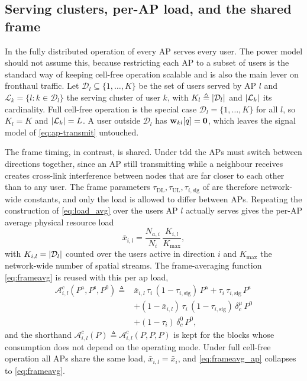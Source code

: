 \subsection{Serving clusters, per-AP load, and the shared frame}
\label{ssec:dmimo_frame}

In the fully distributed operation of  every AP serves
every user. The power model should not assume this, because restricting each AP
to a subset of users is the standard way of keeping cell-free operation scalable
and is also the main lever on fronthaul traffic. Let
$\mathcal{D}_{l}\subseteq\{1,\dots,K\}$ be the set of users served by AP $l$ and
$\mathcal{L}_{k}=\{l:k\in\mathcal{D}_{l}\}$ the serving cluster of user $k$, with
$K_{l}\triangleq\left\lvert\mathcal{D}_{l}\right\rvert$ and $\left\lvert\mathcal{L}_{k}\right\rvert$ its
cardinality. Full cell-free operation is the special case
$\mathcal{D}_{l}=\{1,\dots,K\}$ for all $l$, so $K_{l}=K$ and
$\left\lvert\mathcal{L}_{k}\right\rvert=L$. A user outside $\mathcal{D}_{l}$ has
$\boldsymbol{\mathrm{w}}_{kl}[q]=\boldsymbol{\mathrm{0}}$, which leaves the signal model of
\eqref{eq:ap-transmit} untouched.

The frame timing, in contrast, is shared. Under \gls{tdd} the APs must switch
between directions together, since an AP still transmitting while a neighbour
receives creates cross-link interference between nodes that are far closer to
each other than to any user. The frame parameters
$\tau_{\mathrm{DL}},\tau_{\mathrm{UL}},\tau_{i,\mathrm{sig}}$ of
 are therefore network-wide constants, and only the load is
allowed to differ between APs. Repeating the construction of
\eqref{eq:load_avg} over the users AP $l$ actually serves gives the per-AP
average physical resource load
\begin{equation}
\label{eq:load_ap}
\bar x_{i,l} = \frac{N_{a,i}}{N_{i}}\,\frac{K_{i,l}}{K_{\max}},
\end{equation}
with $K_{i,l}=\left\lvert\mathcal{D}_{l}\right\rvert$ counted over the users active in direction
$i$ and $K_{\max}$ the network-wide number of spatial streams. The
frame-averaging function \eqref{eq:frameavg} is reused with this per \gls{ap} load,
\begin{align}
\label{eq:frameavg_ap}
\mathcal{A}_{i,l}^{c}\!\left(P^{\mathrm a},P^{\mathrm s},P^{0}\right)
\triangleq{}&
\bar x_{i,l}\,\tau_i\,(1-\tau_{i,\mathrm{sig}})\,P^{\mathrm a}
+ \tau_i\,\tau_{i,\mathrm{sig}}\,P^{\mathrm s} \nonumber\\
&+ (1-\bar x_{i,l})\,\tau_i\,(1-\tau_{i,\mathrm{sig}})\,\delta^{\mu}_c\,P^{0}
\nonumber\\
&+ (1-\tau_i)\,\delta^{0}_c\,P^{0},
\end{align}
and the shorthand $\mathcal{A}_{i,l}^{c}(P)\triangleq
\mathcal{A}_{i,l}^{c}(P,P,P)$ is kept for the blocks whose consumption does not
depend on the operating mode. Under full cell-free operation all APs share the
same load, $\bar x_{i,l}=\bar x_{i}$, and \eqref{eq:frameavg_ap} collapses to
\eqref{eq:frameavg}.

